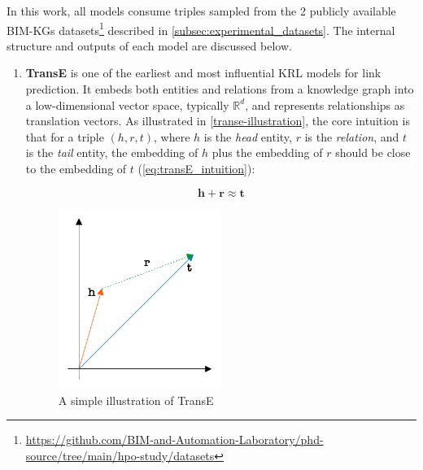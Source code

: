 In this work, all models consume  triples sampled from the 2 publicly available \acp{BIM-KG} datasets\footnote{\url{https://github.com/BIM-and-Automation-Laboratory/phd-source/tree/main/hpo-study/datasets}} described in \autoref{subsec:experimental_datasets}.
The internal structure and outputs of each model are discussed below.
\begin{enumerate}
    \item 
    \textbf{TransE} is one of the earliest and most influential \ac{KRL} models for link prediction. It embeds both entities and relations from a knowledge graph into a low-dimensional vector space, typically $\mathbb{R}^d$, and represents relationships as translation vectors. As illustrated in \autoref{transe-illustration}, the core intuition is that for a triple $(h, r, t)$, where $h$ is the \emph{head} entity, $r$ is the \emph{relation}, and $t$ is the \emph{tail} entity, the embedding of $h$ plus the embedding of $r$ should be close to the embedding of $t$ (\autoref{eq:transE_intuition}):

\begin{equation}
\label{eq:transE_intuition}
    \mathbf{h} + \mathbf{r} \approx \mathbf{t}
\end{equation}

\begin{figure}[t]
        \centering      \includegraphics[width=0.5\textwidth]{figures/transe_illustration.pdf}
        \caption{A simple illustration of TransE} \label{transe-illustration}
\end{figure}


\end{enumerate}
